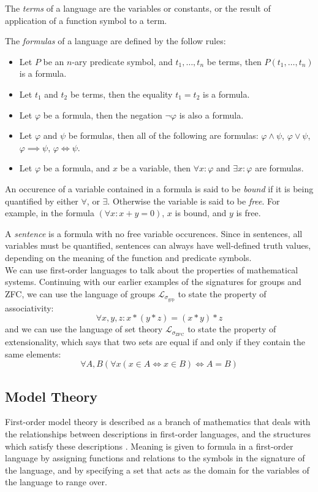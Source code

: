 \documentclass[12pt]{article}
\theoremstyle{definition}
\begin{document}
The \emph{terms} of a language are the variables or constants, or the result of application of a function symbol to a term.

The \emph{formulas} of a language are defined by the follow rules:
\begin{itemize}
  \item Let $P$ be an $n$-ary predicate symbol, and $t_1,\ldots,t_n$ be terms, then $P(t_1,\ldots,t_n)$ is a formula.
  \item Let $t_1$ and $t_2$ be terms, then the equality $t_1 = t_2$ is a formula.
  \item Let $\varphi$ be a formula, then the negation $\neg\varphi$ is also a formula.
  \item Let $\varphi$ and $\psi$ be formulas, then all of the following are formulas: $\varphi\wedge\psi$, $\varphi\vee\psi$, $\varphi\implies\psi$, $\varphi\iff\psi$.
  \item Let $\varphi$ be a formula, and $x$ be a variable, then $\forall x:\varphi$ and $\exists x:\varphi$ are formulas.
\end{itemize}
An occurence of a variable contained in a formula is said to be \emph{bound} if it is being quantified by either $\forall$, or $\exists$.
Otherwise the variable is said to be \emph{free}. For example, in the formula $(\forall x: x+y=0)$, $x$ is bound, and $y$ is free.

A \emph{sentence} is a formula with no free variable occurences.
Since in sentences, all variables must be quantified, sentences can always have well-defined truth values, depending on the meaning of the function and predicate symbols.\\

\noindent
We can use first-order languages to talk about the properties of mathematical systems.
Continuing with our earlier examples of the signatures for groups and ZFC, we can use the language of groups $\mathcal{L}_{\sigma_{\text{grp}}}$ to state the property of associativity:
$$\forall x,y,z: x*(y*z) = (x*y)*z$$
and we can use the language of set theory $\mathcal{L}_{\sigma_{\text{ZFC}}}$ to state the property of extensionality, which says that two sets are equal if and only if they contain the same elements:
$$\forall A,B (\forall x (x\in A \iff x\in B) \iff A = B)$$

\subsection{Model Theory}
First-order model theory is described as a branch of mathematics that deals with the relationships between descriptions in first-order languages, and the structures which satisfy these descriptions \cite{stanmodel}.
Meaning is given to formula in a first-order language by assigning functions and relations to the symbols in the signature of the language, and by specifying a set that acts as the domain for the variables of the language to range over.
\end{document}
